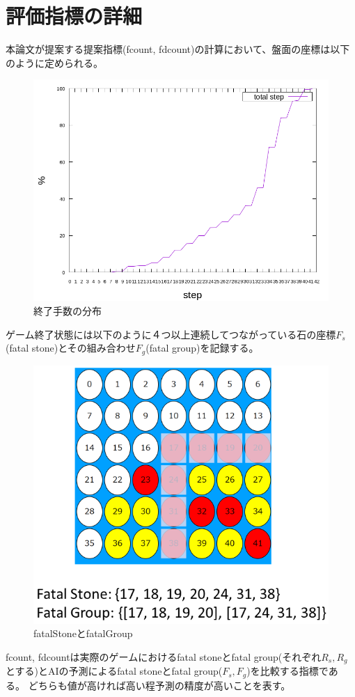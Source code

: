 \section{評価指標の詳細}
本論文が提案する提案指標(fcount, fdcount)の計算において、盤面の座標は以下のように定められる。
\begin{figure}[t]
	\centering
	\includegraphics[width=\linewidth]{./figure/stepCum.png}
	\caption{終了手数の分布}
	\label{fig:stepCUm}
\end{figure}
ゲーム終了状態には以下のように４つ以上連続してつながっている石の座標$F_s$(fatal stone)とその組み合わせ$F_g$(fatal group)を記録する。
\begin{figure}[t]
	\centering
	\includegraphics[width=\linewidth]{./figure/fatalGroup.png}
	\caption{fatalStoneとfatalGroup}
	\label{fig:fatalGroup}
\end{figure}
fcount, fdcountは実際のゲームにおけるfatal stoneとfatal group(それぞれ$R_s, R_g$とする)とAIの予測によるfatal stoneとfatal group($F_s, F_g$)を比較する指標である。
どちらも値が高ければ高い程予測の精度が高いことを表す。

